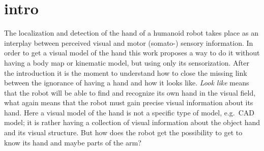 \documentclass[conference]{IEEEtran}
\begin{document}
%
%
\section{intro}\label{intro}
The localization and detection of the hand of a humanoid robot takes place as an interplay between perceived visual and motor (somato-) sensory information. In order to get a visual model of the hand this work proposes a way to do it without having a body map or kinematic model, but using only its sensorization. After the introduction it is the moment to understand how to close the missing link between the ignorance of having a hand and how it looks like. \textit{Look like} means that the robot will be able to find and recognize its own hand in the visual field, what again means that the robot must gain precise visual information about its hand. Here a visual model of the hand is not a specific type of model, e.g.\ CAD model; it is rather having a collection of visual information about the object hand and its visual structure. %
But how does the robot get the possibility to get to know its hand and maybe parts of the arm? %
\end{document}
